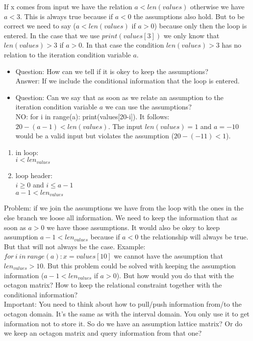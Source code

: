 \documentclass[11pt]{article}
\begin{document}
If x comes from input we have the relation $a < len(values)$ otherwise we have $a < 3$. This is always true because if $a < 0$ the assumptions also hold. But to be correct we need to say ($a < len(values)$ if $a > 0$) because only then the loop is entered. In the case that we use $print(values[3])$ we only know that $len(values) > 3$ if $a > 0$. In that case the condition $len(values) > 3$ has no relation to the iteration condition variable $a$.\\
\begin{itemize}
  \item Question: How can we tell if it is okey to keep the assumptions?\\
  Answer: If we include the conditional information that the loop is entered.
  \item Question: Can we say that as soon as we relate an assumption to the iteration condition variable $a$ we can use the assumptions?\\
  NO: for i in range(a): print(values[20-i]). It follows: $20-(a-1) < len(values)$. The input $len(values) = 1$ and $a = -10$ would be a valid input but violates the assumption ($20-(-11) < 1$).
\end{itemize}


\begin{enumerate}
  \item in loop:\\
  $i < len_{values}$
  
  \item loop header:\\
  $i \geq 0$ and $i \leq a-1$\\
  $a-1 < len_{values}$
\end{enumerate}

Problem: if we join the assumptions we have from the loop with the ones in the else branch we loose all information. We need to keep the information that as soon as $a > 0$ we have those assumptions. It would also be okey to keep assumption $a-1 < len_{values}$ because if $a < 0$ the relationship will always be true. But that will not always be the case. Example: $for\:i\:in\:range(a): x = values[10]$ we cannot have the assumption that $len_{values} > 10$. But this problem could be solved with keeping the assumption information ($a-1 < len_{values}$ if $a > 0$). But how would you do that with the octagon matrix? How to keep the relational constraint together with the conditional information?\\
Important: You need to think about how to pull/push information from/to the octagon domain. It's the same as with the interval domain. You only use it to get information not to store it. So do we have an assumption lattice matrix? Or do we keep an octagon matrix and query information from that one?
\end{document}
